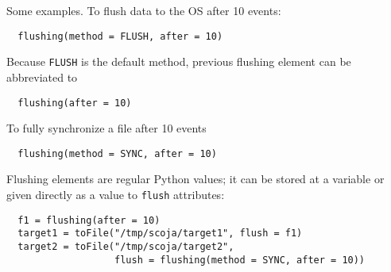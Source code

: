 Some examples.
To flush data to the OS after 10 events:
\begin{verbatim}
  flushing(method = FLUSH, after = 10)
\end{verbatim}
Because {\tt FLUSH} is the default method, previous flushing element
can be abbreviated to
\begin{verbatim}
  flushing(after = 10)
\end{verbatim}
To fully synchronize a file after 10 events
\begin{verbatim}
  flushing(method = SYNC, after = 10)
\end{verbatim}
Flushing elements are regular Python values;
it can be stored at a variable
or given directly as a value to {\tt flush} attributes:
\begin{verbatim}
  f1 = flushing(after = 10)
  target1 = toFile("/tmp/scoja/target1", flush = f1)
  target2 = toFile("/tmp/scoja/target2",
                   flush = flushing(method = SYNC, after = 10))
\end{verbatim}

